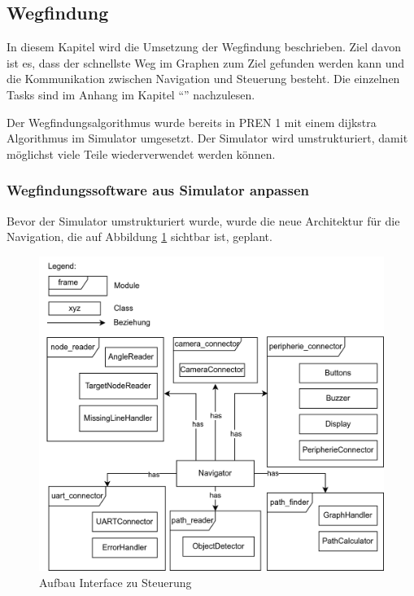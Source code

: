 \subsection{Wegfindung}

In diesem Kapitel wird die Umsetzung der Wegfindung beschrieben. Ziel davon ist es, dass der schnellste Weg im Graphen zum Ziel gefunden werden kann und die Kommunikation zwischen Navigation und Steuerung besteht. Die einzelnen Tasks sind im Anhang im Kapitel ``'' nachzulesen.

Der Wegfindungsalgorithmus wurde bereits in PREN 1 mit einem \gls{dijkstra} Algorithmus im Simulator umgesetzt. Der Simulator wird umstrukturiert, damit möglichst viele Teile wiederverwendet werden können.

\subsubsection{Wegfindungssoftware aus Simulator anpassen}
\label{navigation-arch}

Bevor der Simulator umstrukturiert wurde, wurde die neue Architektur für die Navigation, die auf Abbildung \ref{fig:nav-arch} sichtbar ist, geplant.

\begin{figure}[H]
\centering
\includegraphics[width=\textwidth]{assets/IT/robot-sw-architecture-arch.png}
\caption{Aufbau Interface zu Steuerung}
\label{fig:nav-arch}
\end{figure}

